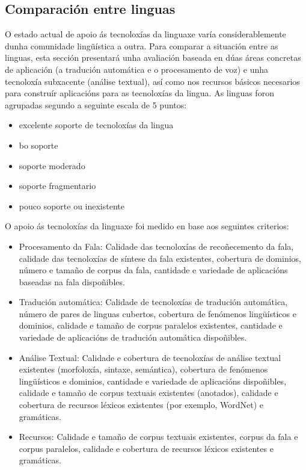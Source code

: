 \begin{multicols}{2}
\subsection{Comparación entre linguas}
   O estado actual de apoio ás tecnoloxías da linguaxe varía considerablemente dunha comunidade lingüística a outra. Para comparar a situación entre as linguas, esta sección presentará unha avaliación baseada en dúas áreas concretas de aplicación (a tradución automática e o procesamento de voz) e unha tecnoloxía subxacente (análise textual), así como nos recursos básicos necesarios para construír aplicacións para as tecnoloxías da lingua. As linguas foron agrupadas segundo a seguinte escala de 5 puntos:
   
\begin{itemize}
\item excelente soporte de tecnoloxías da lingua
\item bo soporte
\item soporte moderado
\item soporte fragmentario
\item pouco soporte ou inexistente
\end{itemize}

O apoio ás tecnoloxías da linguaxe foi medido en base aos seguintes criterios:

\begin{itemize}
\item Procesamento da Fala: Calidade das tecnoloxías de recoñecemento da fala, calidade das tecnoloxías de síntese da fala existentes, cobertura de dominios, número e tamaño de corpus da fala, cantidade e variedade de aplicacións baseadas na fala dispoñibles.
\item Tradución automática: Calidade de tecnoloxías de tradución automática, número de pares de linguas cubertos, cobertura de fenómenos lingüísticos e dominios, calidade e tamaño de corpus paralelos existentes, cantidade e variedade de aplicacións de tradución automática dispoñibles.
\item Análise Textual: Calidade e cobertura de tecnoloxías de análise textual existentes (morfoloxía, sintaxe, semántica), cobertura de fenómenos lingüísticos e dominios, cantidade e variedade de aplicacións dispoñibles, calidade e tamaño de corpus textuais existentes (anotados), calidade e cobertura de recursos léxicos existentes (por exemplo, WordNet) e gramáticas.
\item Recursos: Calidade e tamaño de corpus textuais existentes, corpus da fala e corpus paralelos, calidade e cobertura de recursos léxicos existentes e gramáticas.
\end{itemize}


\end{multicols}
